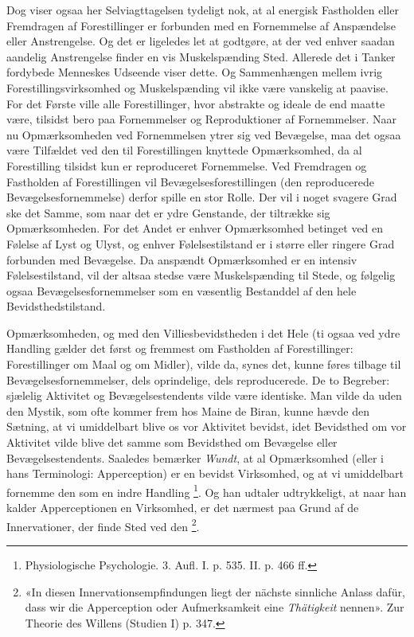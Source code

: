 \documentclass[12pt,a4paper,openany]{book}
\newcommand{\opage}[1]{\marginnote{\footnotesize\textit{[#1]}}}
\begin{document}
Dog viser ogsaa her Selviagttagelsen tydeligt nok, at al energisk Fastholden
eller Fremdragen af Forestillinger er forbunden med en Fornemmelse af
Anspændelse eller Anstrengelse. Og det er ligeledes let at godtgøre, at der ved
enhver saadan aandelig Anstrengelse finder en vis Muskelspænding Sted. Allerede
det i Tanker fordybede Menneskes Udseende viser dette. Og Sammenhængen mellem
ivrig Forestillingsvirksomhed og Muskelspænding vil ikke være vanskelig at
paavise. For det Første ville alle Forestillinger, hvor abstrakte og ideale de
end maatte være, tilsidst bero paa Fornemmelser og Reproduktioner af
Fornemmelser. Naar nu Opmærksomheden ved Fornemmelsen ytrer sig ved Bevægelse,
maa det ogsaa være Tilfældet ved den til Forestillingen knyttede Opmærksomhed,
da al Forestilling tilsidst kun er reproduceret Fornemmelse. Ved Fremdragen og
Fastholden af Forestillingen vil Bevægelsesforestillingen (den reproducerede
Bevægelsesfornemmelse) derfor spille en stor Rolle. Der vil i noget svagere
Grad ske det Samme, som naar det er ydre Genstande, der tiltrække sig
Opmærksomheden. For det Andet er enhver Opmærksomhed betinget ved en Følelse af
Lyst og Ulyst, og enhver Følelsestilstand er i større eller ringere Grad
forbunden med Bevægelse. Da anspændt Opmærksomhed er en intensiv
Følelsestilstand, vil der altsaa stedse være Muskelspænding til Stede, og
følgelig ogsaa Bevægelsesfornemmelser som en væsentlig Bestanddel af den hele
Bevidsthedstilstand.

Opmærksomheden, og med den Villiesbevidstheden i det Hele (ti ogsaa ved ydre
Handling gælder det først og fremmest om Fastholden af Forestillinger:
Forestillinger om
\setcounter{footnote}{0}%
\opage{70}Maal og om Midler), vilde da, synes det, kunne føres tilbage til
Bevægelsesfornemmelser, dels oprindelige, dels reproducerede. De to Begreber:
sjælelig Aktivitet og Bevægelsestendents vilde være identiske. Man vilde da
uden den Mystik, som ofte kommer frem hos Maine de Biran, kunne hævde den
Sætning, at vi umiddelbart blive os vor Aktivitet bevidst, idet Bevidsthed om
vor Aktivitet vilde blive det samme som Bevidsthed om Bevægelse eller
Bevægelsestendents. Saaledes bemærker \emph{Wundt}, at al Opmærksomhed (eller i
hans Terminologi: Apperception) er en bevidst Virksomhed, og at vi umiddelbart
fornemme den som en indre Handling%
\footnote[1]{Physiologische Psychologie. 3. Aufl. I. p. 535. II. p. 466 ff.}.
Og han udtaler udtrykkeligt, at naar han kalder Apperceptionen en Virksomhed,
er det nærmest paa Grund af de Innervationer, der finde Sted ved den%
\footnote[2]{«In diesen Innervationsempfindungen liegt der nächste sinnliche
Anlass dafür, dass wir die Apperception oder Aufmerksamkeit eine
\emph{Thätigkeit} nennen». Zur Theorie des Willens (Studien I) p. 347.}.
\end{document}
